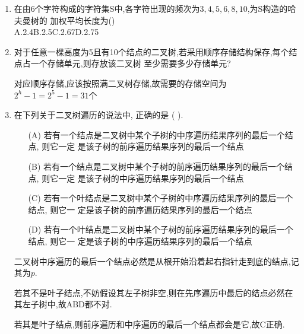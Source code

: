 \documentclass[12pt, a4paper, oneside, UTF8]{ctexbook}
\begin{document}
\begin{enumerate}
    \item 在由6个字符构成的字符集S中,各字符出现的频次为\underline{$3,4,5,6,8,10$},为S构造的哈夫曼树的
    加权平均长度为() \\
    A.2.4\qquad\qquad B.2.5\qquad\qquad C.2.67\qquad\qquad D.2.75
    \item 对于任意一棵高度为5且有10个结点的二叉树,若采用顺序存储结构保存,每个结点占一个存储单元,则存放该二叉树
    至少需要多少存储单元? 
    \begin{solution}
    对应顺序存储,应该按照满二叉树存储,故需要的存储空间为$2^h-1=2^5-1=31$个
    \end{solution}
    \item 在下列关于二叉树遍历的说法中, 正确的是 (   ).
    \begin{enumerate}
        \item[(A)]若有一个结点是二叉树中某个子树的中序遍历结果序列的最后一个结点, 则它一定
        是该子树的前序遍历结果序列的最后一个结点
        \item[(B)] 若有一个结点是二叉树中某个子树的前序遍历结果序列的最后一个结点, 则它一定
        是该子树的中序遍历结果序列的最后一个结点
        \item[(C)]若有一个叶结点是二叉树中某个子树的中序遍历结果序列的最后一个结点, 则它一
        定是该子树的前序遍历结果序列的最后一个结点
        \item[(D)] 若有一个叶结点是二叉树中某个子树的前序遍历结果序列的最后一个结点, 则它一
        定是该子树的中序遍历结果序列的最后一个结点
    \end{enumerate}
    \begin{solution}
        二叉树中序遍历的最后一个结点必然是从根开始沿着起右指针走到底的结点,记其为$p$. 
        
        若其不是叶子结点,不妨假设其左子树非空,则在先序遍历中最后的结点必然在其左子树中,故ABD都不对.  

        若其是叶子结点,则前序遍历和中序遍历的最后一个结点都会是它,故C正确.
    \end{solution}
\end{enumerate}
\end{document}
